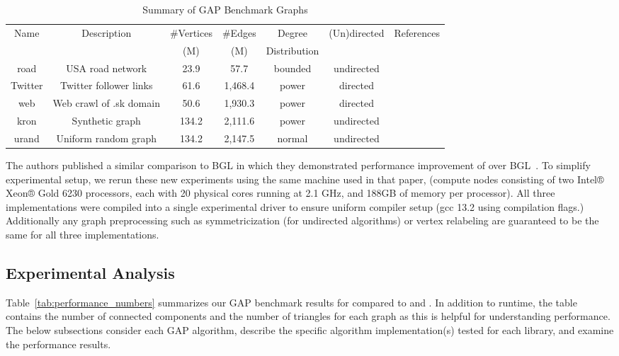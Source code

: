 \begin{table}[h!]
\centering
\begin{tabular}{c c c c c c c}
Name & Description & \#Vertices & \#Edges & Degree & (Un)directed & References \\
     &             & (M)        & (M)     & Distribution & & \\\hline
road & USA road network & 23.9 & 57.7 & bounded & undirected & \cite{dimacs9th}\\\hline
Twitter & Twitter follower links & 61.6 & 1,468.4 & power & directed & \cite{Twitter}\\\hline
web & Web crawl of .sk domain & 50.6 & 1,930.3 & power & directed & \cite{LAW1}\\\hline
kron & Synthetic graph & 134.2 & 2,111.6 & power & undirected & \cite{Graph500} \\\hline
urand & Uniform random graph & 134.2 & 2,147.5 & normal & undirected & \cite{Erdos}\\\hline
\end{tabular}
\caption{Summary of GAP Benchmark Graphs}
\label{tab:gap_graphs}
\end{table}

The \nwgraph authors published a similar comparison to BGL in which they
demonstrated performance improvement of \nwgraph over BGL~\cite{REF_nwgraph_paper}.
To simplify experimental setup, we rerun these new experiments using the same machine used in that paper,
(compute nodes consisting of two Intel® Xeon® Gold 6230 processors, each with 20 physical cores running at 2.1 GHz,
and 188GB of memory per processor).
All three implementations were compiled into a single experimental driver to ensure uniform compiler setup (gcc 13.2 using  compilation flags.)
Additionally any graph preprocessing such as symmetricization (for undirected algorithms) or vertex relabeling are guaranteed to be the same for all three implementations.

\subsection{Experimental Analysis}

Table~\ref{tab:performance_numbers} summarizes our GAP benchmark results for \stdgraph compared to \bgl and \nwgraph.
In addition to runtime, the table contains the number of connected components and the number of
triangles for each graph as this is helpful for understanding performance.
The below subsections consider each GAP algorithm, describe the specific algorithm implementation(s)
tested for each library, and examine the performance results.

